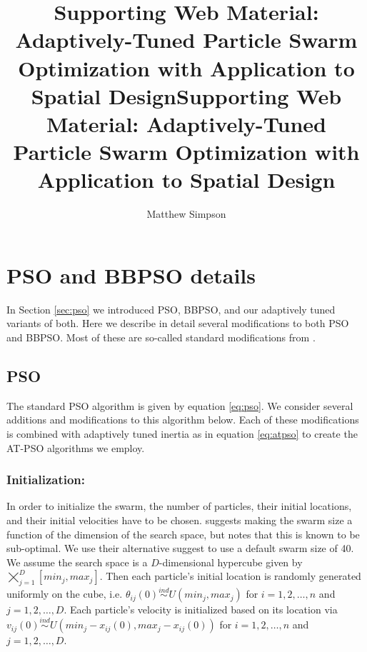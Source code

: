 \documentclass[cmbright]{staauth}
\numberwithin{table}{section}
\begin{document}
\blind
{
  \title{Supporting Web Material: Adaptively-Tuned Particle Swarm Optimization with Application to Spatial Design}
  \author{Matthew Simpson}
  \address{Department of Statistics, University of Missouri,\\
    146 Middlebush Hall, Columbia, MO 65211-6100}
  \received{}
  \accepted{}

}\fi
{}\blind
{
  \title{Supporting Web Material: Adaptively-Tuned Particle Swarm Optimization with Application to Spatial Design}
  \author{}
  \address{}
  \corremail{}
  \received{}
  \accepted{}

}\fi

\maketitle

\appendix
\renewcommand*{\thesection}{S\arabic{section}}

\section{PSO and BBPSO details}\label{app:psodetail}

In Section \ref{sec:pso} we introduced PSO, BBPSO, and our adaptively tuned variants of both. Here we describe in detail several modifications to both PSO and BBPSO. Most of these are so-called standard modifications from \cite{clerc2011spso}.

\subsection{PSO}\label{subapp:pso}
The standard PSO algorithm is given by equation \eqref{eq:pso}. We consider several additions and modifications to this algorithm below. Each of these modifications is combined with adaptively tuned inertia as in equation \eqref{eq:atpso} to create the AT-PSO algorithms we employ.

\subsubsection{Initialization:}
In order to initialize the swarm, the number of particles, their initial locations, and their initial velocities have to be chosen. \cite{clerc2011spso} suggests making the swarm size a function of the dimension of the search space, but notes that this is known to be sub-optimal. We use their alternative suggest to use a default swarm size of 40. We assume the search space is a $D$-dimensional hypercube given by $\bigtimes_{j=1}^D[min_j, max_j]$. Then each particle's initial location is randomly generated uniformly on the cube, i.e. $\theta_{ij}(0)\stackrel{ind}{\sim}U(min_j, max_j)$ for $i=1,2,\dots,n$ and $j=1,2,\dots,D$. Each particle's velocity is initialized based on its location via  $v_{ij}(0)\stackrel{ind}{\sim}U(min_j - x_{ij}(0), max_j - x_{ij}(0))$ for $i=1,2,\dots,n$ and $j=1,2,\dots,D$.
\end{document}

